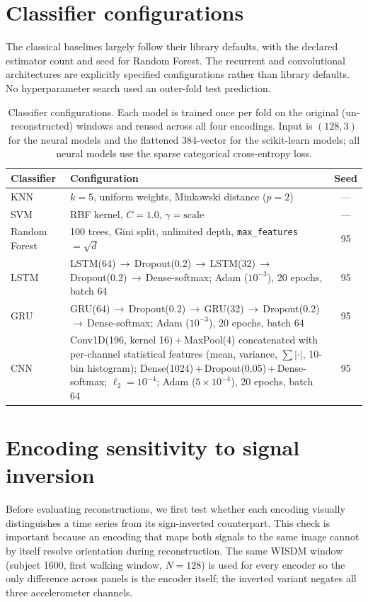 \documentclass[10pt,a4paper,parskip=half-]{scrartcl}
\begin{document}
\section{Classifier configurations}
The classical baselines largely follow their library defaults, with the declared estimator count and seed for Random Forest. The recurrent and convolutional architectures are explicitly specified configurations rather than library defaults. No hyperparameter search used an outer-fold test prediction.
\begin{table}[H]
\centering
\caption{Classifier configurations. Each model is trained once per fold on the original (un-reconstructed) windows and reused across all four encodings. Input is $(128,3)$ for the neural models and the flattened $384$-vector for the scikit-learn models; all neural models use the sparse categorical cross-entropy loss.}
\label{tab:classifier_hyperparams}
\small
\begin{tabular}{@{}lp{9.2cm}c@{}}
\toprule
Classifier & Configuration & Seed \\
\midrule
KNN & $k=5$, uniform weights, Minkowski distance ($p=2$) & --- \\
SVM & RBF kernel, $C=1.0$, $\gamma=\text{scale}$ & --- \\
Random Forest & 100 trees, Gini split, unlimited depth, \texttt{max\_features}$=\sqrt{d}$ & 95 \\
LSTM & LSTM(64)\,$\to$\,Dropout(0.2)\,$\to$\,LSTM(32)\,$\to$\,Dropout(0.2)\,$\to$\,Dense-softmax; Adam ($10^{-3}$), 20 epochs, batch 64 & 95 \\
GRU & GRU(64)\,$\to$\,Dropout(0.2)\,$\to$\,GRU(32)\,$\to$\,Dropout(0.2)\,$\to$\,Dense-softmax; Adam ($10^{-3}$), 20 epochs, batch 64 & 95 \\
CNN & Conv1D(196, kernel 16)\,+\,MaxPool(4) concatenated with per-channel statistical features (mean, variance, $\sum|\cdot|$, 10-bin histogram); Dense(1024)\,+\,Dropout(0.05)\,+\,Dense-softmax; $\ell_2=10^{-4}$; Adam ($5\times10^{-4}$), 20 epochs, batch 64 & 95 \\
\bottomrule
\end{tabular}
\end{table}

\section{Encoding sensitivity to signal inversion}

Before evaluating reconstructions, we first test whether each encoding visually distinguishes a time series from its sign-inverted counterpart. This check is important because an encoding that maps both signals to the same image cannot by itself resolve orientation during reconstruction. The same WISDM window (subject 1600, first walking window, $N=128$) is used for every encoder so the only difference across panels is the encoder itself; the inverted variant negates all three accelerometer channels.
\end{document}
